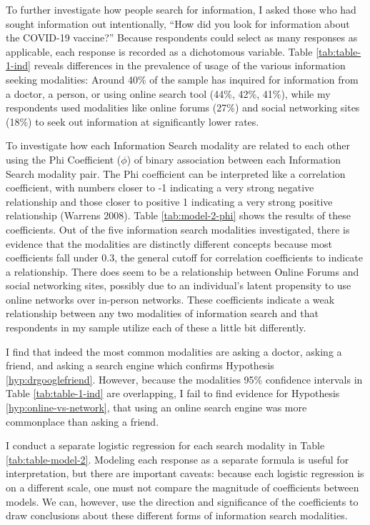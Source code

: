 To further investigate how people search for information, I asked those who had
sought information out intentionally, ``How did you look for information about
the COVID-19 vaccine?'' Because respondents could select as many responses as
applicable, each response is recorded as a dichotomous variable. Table
\ref{tab:table-1-ind} reveals differences in the prevalence of usage of the
various information seeking modalities: Around 40\% of the sample has inquired
for information from a doctor, a person, or using online search tool (44\%,
42\%, 41\%), while my respondents used modalities like online forums (27\%) and
social networking sites (18\%) to seek out information at significantly lower
rates.

To investigate how each Information Search modality are related to each other
using the Phi Coefficient ($\phi$) of binary association between each
Information Search modality pair. The Phi coefficient can be interpreted like a
correlation coefficient, with numbers closer to -1 indicating a very strong
negative relationship and those closer to positive 1 indicating a very strong
positive relationship (Warrens 2008). Table \ref{tab:model-2-phi} shows the
results of these coefficients. Out of the five information search modalities
investigated, there is evidence that the modalities are distinctly different
concepts because most coefficients fall under 0.3, the general cutoff for
correlation coefficients to indicate a relationship. There does seem to be a
relationship between Online Forums and social networking sites, possibly due to
an individual's latent propensity to use online networks over in-person
networks. These coefficients indicate a weak relationship between any two
modalities of information search and that respondents in my sample utilize each
of these a little bit differently.

I find that indeed the most common modalities are asking a doctor, asking a
friend, and asking a search engine which confirms Hypothesis
\ref{hyp:drgooglefriend}. However, because the modalities 95\% confidence
intervals in Table \ref{tab:table-1-ind} are overlapping, I fail to find
evidence for Hypothesis \ref{hyp:online-vs-network}, that using an online search
engine was more commonplace than asking a friend.



I conduct a separate logistic regression for each search modality in Table
\ref{tab:table-model-2}. Modeling each response as a separate formula is useful
for interpretation, but there are important caveats: because each logistic
regression is on a different scale, one must not compare the magnitude of
coefficients between models. We can, however, use the direction and significance
of the coefficients to draw conclusions about these different forms of
information search modalities.


